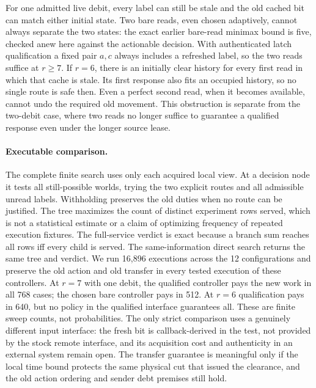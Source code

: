 \documentclass{article}
\begin{document}
For one admitted live debit, every label can still be stale and
the old cached bit can match either initial state. Two bare reads,
even chosen adaptively, cannot always separate the two states:
the exact earlier bare-read minimax bound is five, checked anew
here against the actionable decision. With authenticated
latch qualification a fixed pair $a,c$ always includes a refreshed
label, so the two reads suffice at $r\geq7$. If $r=6$, there is
an initially clear history for every first read in which that
cache is stale. Its first response also fits an occupied history,
so no single route is safe then. Even a perfect second read,
when it becomes available, cannot undo the required old movement.
This obstruction is separate from the two-debit case, where two
reads no longer suffice to guarantee a qualified response even
under the longer source lease.

\paragraph{Executable comparison.}
The complete finite search uses only each acquired local view.
At a decision node it tests all still-possible worlds, trying the
two explicit routes and all admissible unread labels. Withholding
preserves the old duties when no route can be justified. The
tree maximizes the count of distinct experiment rows served, which
is not a statistical estimate or a claim of optimizing frequency
of repeated execution fixtures. The full-service verdict is exact
because a branch sum reaches all rows iff every child is served.
The same-information direct search returns the same tree and
verdict. We run 16,896 executions across the 12 configurations
and preserve the old action and old transfer in every tested
execution of these controllers. At $r=7$ with one debit, the
qualified controller pays the new work in all 768 cases; the
chosen bare controller pays in 512. At $r=6$ qualification pays
in 640, but no policy in the qualified interface guarantees all.
These are finite sweep counts, not probabilities. The only strict
comparison uses a genuinely different input interface: the fresh
bit is callback-derived in the test, not provided by the stock
remote interface, and its acquisition cost and authenticity in an
external system remain open. The transfer guarantee is meaningful
only if the local time bound protects the same physical cut that
issued the clearance, and the old action ordering and sender debt
premises still hold.
\end{document}
